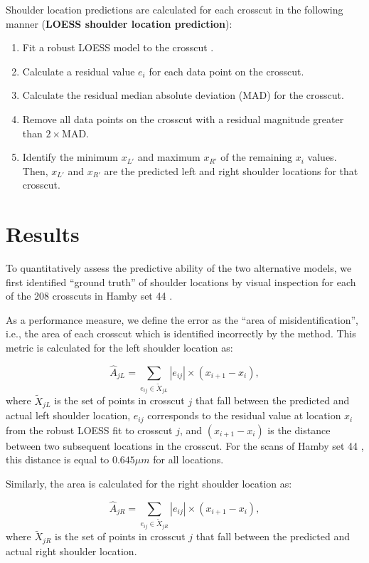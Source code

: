 \documentclass[12pt]{article}
\begin{document}
Shoulder location predictions are calculated for each crosscut in the
following manner (\textbf{LOESS shoulder location prediction}):

\begin{enumerate}
\item Fit a robust LOESS model to the crosscut \citep{locfit}.
\item Calculate a residual value $e_i$ for each data point on the crosscut.  
\item Calculate the residual median absolute deviation (MAD) for the crosscut.  
\item Remove all data points on the crosscut with a residual magnitude greater than $2 \times$MAD.  
\item Identify the minimum $x_{L'}$ and maximum $x_{R'}$ of the remaining $x_i$ values. Then, $x_{L'}$ and $x_{R'}$ are the predicted left and right shoulder locations for that crosscut.   
\end{enumerate}

\section{Results}

To quantitatively assess the predictive ability of the two alternative
models, we first identified ``ground truth'' of shoulder locations by
visual inspection for each of the 208 crosscuts in Hamby set 44
{\color{teal}{and each of the 414 crosscuts in Houston-test}}.

As a performance measure, we define the error as the ``area of
misidentification'', i.e., the area of each crosscut which is identified
incorrectly by the method. This metric is calculated for the left
shoulder location as:

\[ \widehat{A}_{jL} = \sum_{e_{ij} \in \widetilde{X}_{jL}} \left|e_{ij} \right| \times \left(x_{i+1} - x_i \right),\]
where \(\widetilde{X}_{jL}\) is the set of points in crosscut \(j\) that
fall between the predicted and actual left shoulder location, \(e_{ij}\)
corresponds to the residual value at location \(x_i\) from the robust
LOESS fit to crosscut \(j\), and \((x_{i+1} - x_i)\) is the distance
between two subsequent locations in the crosscut. For the scans of Hamby
set 44 {\color{teal}{and Houston-test}}, this distance is equal to
\(0.645 \mu m\) for all locations.

Similarly, the area is calculated for the right shoulder location as:

\[ \widehat{A}_{jR} = \sum_{e_{ij} \in \widetilde{X}_{jR}} \left|e_{ij} \right| \times \left(x_{i+1} - x_i \right),\]
where \(\widetilde{X}_{jR}\) is the set of points in crosscut \(j\) that
fall between the predicted and actual right shoulder location.
\end{document}
